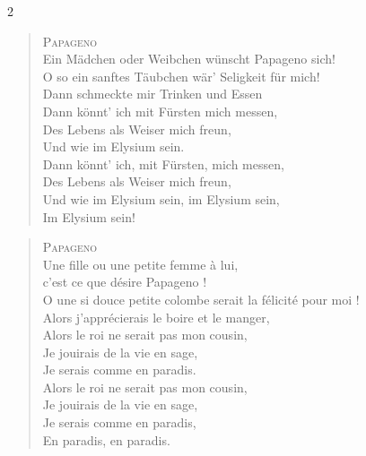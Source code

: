 \documentclass[a4paper,12pt]{article}
\newcommand\chunks[2]{%
\begin{leftcolumn*}\begin{otherlanguage}{german}%
{#1}%
\end{otherlanguage}\end{leftcolumn*}%
\begin{rightcolumn}\begin{otherlanguage}{french}%
{#2}%
\end{otherlanguage}\end{rightcolumn}%
}
\begin{document}
\begin{paracol}{2}
  \chunks{\begin{verse}
          \textsc{Papageno}\\[\medskipamount]
          Ein Mädchen oder Weibchen wünscht Papageno sich!\\
          O so ein sanftes Täubchen wär’ Seligkeit für mich!\\
          Dann schmeckte mir Trinken und Essen\\
          Dann könnt’ ich mit Fürsten mich messen,\\
          Des Lebens als Weiser mich freun,\\
          Und wie im Elysium sein.\\
          Dann könnt’ ich, mit Fürsten, mich messen,\\
          Des Lebens als Weiser mich freun,\\
          Und wie im Elysium sein, im Elysium sein,\\
          Im Elysium sein!
          \end{verse}}
         {\begin{verse}
          \textsc{Papageno}\\[\medskipamount]
          Une fille ou une petite femme à lui,\\
          c’est ce que désire Papageno !\\
          O une si douce petite colombe serait la félicité pour moi !\\
          Alors j’apprécierais le boire et le manger,\\
          Alors le roi ne serait pas mon cousin,\\
          Je jouirais de la vie en sage,\\
          Je serais comme en paradis.\\
          Alors le roi ne serait pas mon cousin,\\
          Je jouirais de la vie en sage,\\
          Je serais comme en paradis,\\
          En paradis, en paradis.
          \end{verse}}


\end{paracol}
\end{document}
